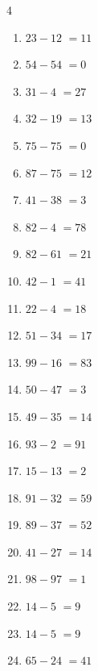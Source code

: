\begin{multicols}{4}
\begin{enumerate}
  \item $23-12$
        $=11$

  \item $54-54$
        $=0$

  \item $31-4$
        $=27$

  \item $32-19$
        $=13$

  \item $75-75$
        $=0$

  \item $87-75$
        $=12$

\columnbreak %

  \item $41-38$
        $=3$

  \item $82-4$
        $=78$

  \item $82-61$
        $=21$

  \item $42-1$
        $=41$

  \item $22-4$
        $=18$

  \item $51-34$
        $=17$

  \item $99-16$
        $=83$

  \item $50-47$
        $=3$

  \item $49-35$
        $=14$

  \item $93-2$
        $=91$

  \item $15-13$
        $=2$

  \item $91-32$
        $=59$

  \item $89-37$
        $=52$

  \item $41-27$
        $=14$

  \item $98-97$
        $=1$

  \item $14-5$
        $=9$

  \item $14-5$
        $=9$

  \item $65-24$
        $=41$


\end{enumerate}
\end{multicols}
